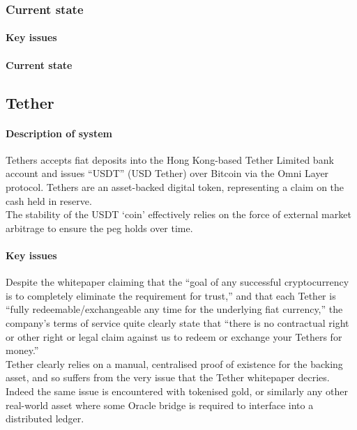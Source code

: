 \subsubsection{Current state}

\paragraph{Key issues}

\paragraph{Current state}

\subsection{Tether}

\paragraph{Description of system}

Tethers accepts fiat deposits into the Hong Kong-based Tether Limited bank account and issues ``USDT'' (USD Tether) over Bitcoin via the Omni Layer protocol. Tethers are an asset-backed digital token, representing a claim on the cash held in reserve. \\

\noindent The stability of the USDT `coin' effectively relies on the force of external market arbitrage to ensure the peg holds over time. \\

\paragraph{Key issues}

Despite the whitepaper claiming that the ``goal of any successful cryptocurrency is to completely eliminate the requirement for trust,'' and that each Tether is ``fully redeemable/exchangeable any time for the underlying fiat currency,'' the company's terms of service quite clearly state that ``there is no contractual right or other right or legal claim against us to redeem or exchange your Tethers for money.'' \\

\noindent Tether clearly relies on a manual, centralised proof of existence for the backing asset, and so suffers from the very issue that the Tether whitepaper decries. Indeed the same issue is encountered with tokenised gold, or similarly any other real-world asset where some Oracle bridge is required to interface into a distributed ledger. \\

